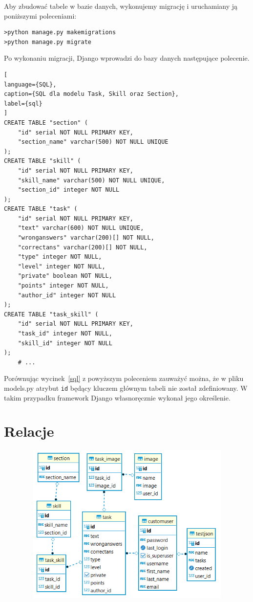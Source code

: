 \documentclass[oneside,polski,logo,indent]{amuthesis}
\begin{document}
Aby zbudować tabele w bazie danych, wykonujemy migrację i uruchamiany ją poniższymi poleceniami: 

\begin{lstlisting}[style=DOS]
>python manage.py makemigrations
>python manage.py migrate
\end{lstlisting}
Po wykonaniu migracji, Django wprowadzi do bazy danych następujące polecenie.
\begin{lstlisting}[
language={SQL},
caption={SQL dla modelu Task, Skill oraz Section},
label={sql}
]
CREATE TABLE "section" (
	"id" serial NOT NULL PRIMARY KEY, 
	"section_name" varchar(500) NOT NULL UNIQUE
);
CREATE TABLE "skill" (
	"id" serial NOT NULL PRIMARY KEY, 
	"skill_name" varchar(500) NOT NULL UNIQUE, 
	"section_id" integer NOT NULL
);
CREATE TABLE "task" (
	"id" serial NOT NULL PRIMARY KEY, 
	"text" varchar(600) NOT NULL UNIQUE, 
	"wronganswers" varchar(200)[] NOT NULL, 
	"correctans" varchar(200)[] NOT NULL,
	"type" integer NOT NULL, 
	"level" integer NOT NULL, 
	"private" boolean NOT NULL, 
	"points" integer NOT NULL, 
	"author_id" integer NOT NULL
);
CREATE TABLE "task_skill" (
	"id" serial NOT NULL PRIMARY KEY, 
	"task_id" integer NOT NULL, 
	"skill_id" integer NOT NULL
);
	# ...
\end{lstlisting}

Porównując wycinek~\ref{sql} z powyższym poleceniem zauważyć można, że w pliku models.py atrybut \texttt{id} będący kluczem głównym tabeli nie został zdefiniowany. W takim przypadku framework Django własnoręcznie wykonał jego określenie.

\section{Relacje}

\begin{figure}[H]
  \centering
  \includegraphics[width=12cm, height=8cm]{gl-relacje.png}
  \caption{}
  \label{relacje}
\end{figure}
\end{document}
